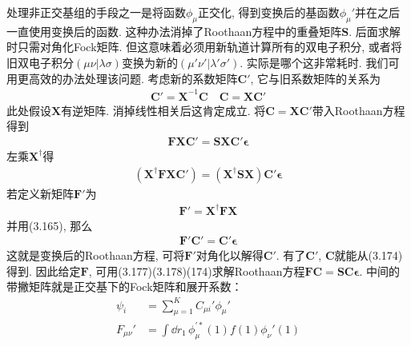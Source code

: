 处理非正交基组的手段之一是将函数${\phi_\mu}$正交化, 得到变换后的基函数$\phi_\mu'$并在之后一直使用变换后的函数. 这种办法消掉了Roothaan方程中的重叠矩阵$\mathbf{S}$. 后面求解时只需对角化Fock矩阵. 但这意味着必须用新轨道计算所有的双电子积分, 或者将旧双电子积分$(\mu\nu|\lambda\sigma)$变换为新的$(\mu'\nu'|\lambda'\sigma')$. 实际是哪个这非常耗时. 我们可用更高效的办法处理该问题. 考虑新的系数矩阵$\mathbf{C}'$, 它与旧系数矩阵的关系为
\begin{align}
\mathbf{C'=X}^{-1}\mathbf{C}\quad \mathbf{C=XC'}
\end{align}
此处假设$\mathbf{X}$有逆矩阵. 消掉线性相关后这肯定成立. 将$\mathbf{C=XC'}$带入Roothaan方程得到
\begin{align}
\mathbf{FXC'=SXC'}\bm{\epsilon}
\end{align} 
左乘$\mathbf{X^\dagger}$得
\begin{align}
(\mathbf{X^\dagger FX}\mathbf{C'}) = (\mathbf{X^\dagger SX})\mathbf{C'}\bm{\epsilon}
\end{align}
若定义新矩阵$\mathbf{F}'$为
\begin{align}
\mathbf{F'=X^\dagger FX}
\end{align}
并用(3.165), 那么
\begin{align}
\mathbf{F'C'=C'}\bm{\epsilon}
\end{align}
这就是变换后的Roothaan方程, 可将$\mathbf{F'}$对角化以解得$\mathbf{C'}$. 有了$\mathbf{C'}$, $\mathbf{C}$就能从(3.174)得到. 因此给定$\mathbf{F}$, 可用(3.177)(3.178)(174)求解Roothaan方程$\mathbf{FC=SC}\bm{\epsilon}$. 中间的带撇矩阵就是正交基下的Fock矩阵和展开系数：
\begin{align}
\psi_i & = \sum_{\mu=1}^{K}C_{\mu i}'\phi_\mu'\\
F_{\mu\nu}' & = \int\dd{r}_1\,\phi^{\prime*}_\mu(1)f(1)\phi_\nu'(1)
\end{align}
